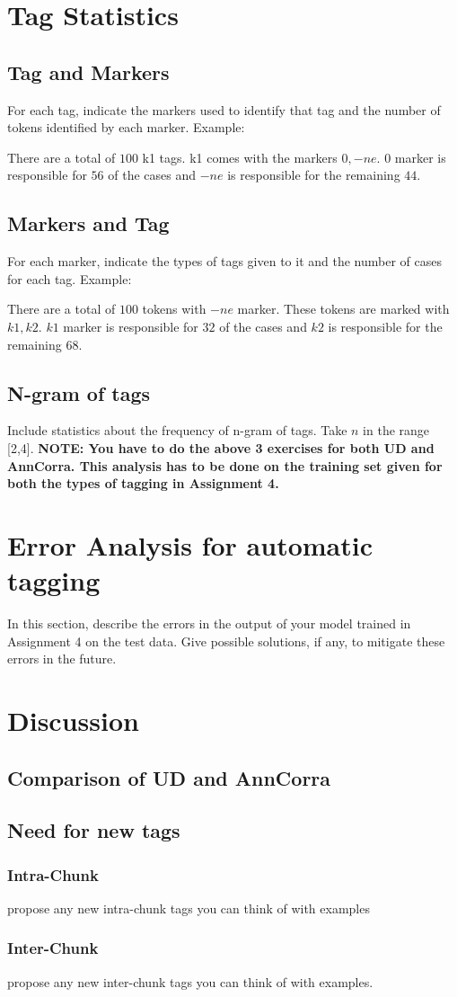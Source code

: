 \documentclass[a4 paper]{article}
\begin{document}
\section{Tag Statistics}

\subsection{Tag and Markers}

For each tag, indicate the markers used to identify that tag and the number of tokens identified by each marker. Example:

There are a total of $100$ k1 tags. k1 comes with the markers $0, -ne$. $0$ marker is responsible for $56$ of the cases and $-ne$ is responsible for the remaining $44$.

\subsection{Markers and Tag}

For each marker, indicate the types of tags given to it and the number of cases for each tag. Example:

There are a total of $100$ tokens with $-ne$ marker. These tokens are marked with $k1, k2$. $k1$ marker is responsible for $32$ of the cases and $k2$ is responsible for the remaining $68$.

\subsection{N-gram of tags}
Include statistics about the frequency of n-gram of tags. Take $n$ in the range [2,4].
\newline \newline \newline
\textbf{NOTE: You have to do the above 3 exercises for both UD and AnnCorra. This analysis has to be done on the training set given for both the types of tagging in Assignment 4.}

\section{Error Analysis for automatic tagging}
In this section, describe the errors in the output of your model trained in Assignment 4 on the test data. Give possible solutions, if any, to mitigate these errors in the future. 

\section{Discussion}

\subsection{Comparison of UD and AnnCorra}
\subsection{Need for new tags}
\subsubsection{Intra-Chunk}
propose any new intra-chunk tags you can think of with examples
\subsubsection{Inter-Chunk}
propose any new inter-chunk tags you can think of with examples.
\end{document}
